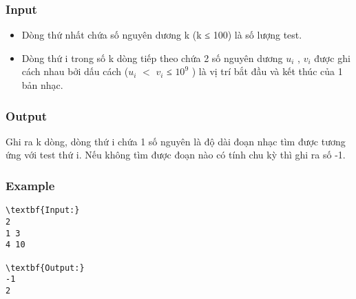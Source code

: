 \subsubsection{Input}
\begin{itemize}
	\item Dòng thứ nhất chứa số nguyên dương k (k ≤ 100) là số lượng test.
	\item Dòng thứ i trong số k dòng tiếp theo chứa 2 số nguyên dương $u_{i}$ , $v_{i}$ được ghi cách nhau bởi dấu cách ($u_{i}$ $<$ $v_{i}$ ≤ $10^{9}$ ) là vị trí bắt đầu và kết thúc của 1 bản nhạc.
\end{itemize}

\subsubsection{Output}

Ghi ra k dòng, dòng thứ i chứa 1 số nguyên là độ dài đoạn nhạc tìm được tương ứng với test thứ i. Nếu không tìm được đoạn nào có tính chu kỳ thì ghi ra số -1.

\subsubsection{Example}
\begin{verbatim}
\textbf{Input:}
2
1 3
4 10

\textbf{Output:}
-1
2 
\end{verbatim}
